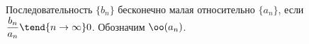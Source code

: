
    Последовательность $\{b_n\}$ бесконечно малая относительно $\{a_n\}$, если $\dfrac{b_n}{a_n}\tend{n\to\infty}0$. Обозначим $\oo(a_n)$.
